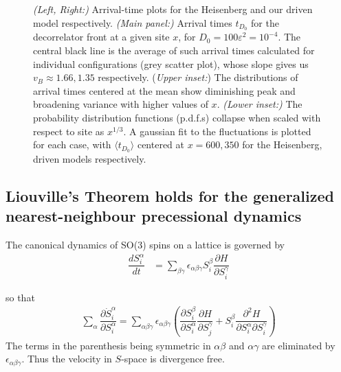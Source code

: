 \documentclass[prl,aps,twocolumn,nosuperscriptaddress,bibnotes,notitlepage,nofootinbib]{revtex4-2}
\begin{document}
\begin{figure*}[htp]
\centering
             \quad \quad  \quad
\caption{\small \textit{(Left, Right:)} Arrival-time plots for the Heisenberg and our driven model respectively. \textit{(Main panel:)}  Arrival times $t_{D_0}$ for the decorrelator front at a given site $x$, for $D_{0} = 100 \varepsilon^2 = 10^{-4}$. The central black line is the average of such arrival times calculated for individual configurations (grey scatter plot), whose slope gives us $v_B \approx 1.66, 1.35$ respectively. (\textit{Upper inset:}) The distributions of arrival times centered at the mean show diminishing peak and broadening variance with higher values of $x$. \textit{(Lower inset:)} The probability distribution functions (p.d.f.s) collapse when scaled with respect to site as $x^{1/3}$. A gaussian fit to the fluctuations is plotted for each case, with $\langle t_{D_0} \rangle$ centered at $x=600, 350$ for the Heisenberg, driven models respectively.}
\label{fig:Arrivaltime_sup}
\end{figure*}

\subsection*{Liouville's Theorem holds for the generalized nearest-neighbour precessional dynamics }

The canonical dynamics of SO(3) spins on a lattice is governed by
\begin{align}
    \label{eqn:canonical_dyn}
    \dfrac{d S_{i}^{\alpha}}{dt} &= \sum_{\beta \gamma}\epsilon_{\alpha \beta \gamma}S_i^{\beta}\dfrac{\partial H}{\partial S_i^{\gamma}}
\end{align}

so that
\begin{align}
    \sum_{\alpha} \dfrac{\partial \dot{S}_i^{\alpha}}{\partial S_i^{\alpha}} = \sum_{\alpha \beta \gamma} \epsilon_{\alpha \beta \gamma}\left(\dfrac{\partial S_i^{\beta}}{\partial S_i^{\alpha}}\dfrac{\partial H}{\partial S_j^{\gamma}} + S_i^{\beta}\dfrac{\partial^2 H}{\partial S_i^{\alpha} \partial S_i^{\gamma}}\right)
\end{align}
The terms in the parenthesis being symmetric in $\alpha \beta$ and $\alpha \gamma$ are eliminated by $\epsilon_{\alpha \beta \gamma}$. Thus the velocity in $S$-space is divergence free.
\end{document}
